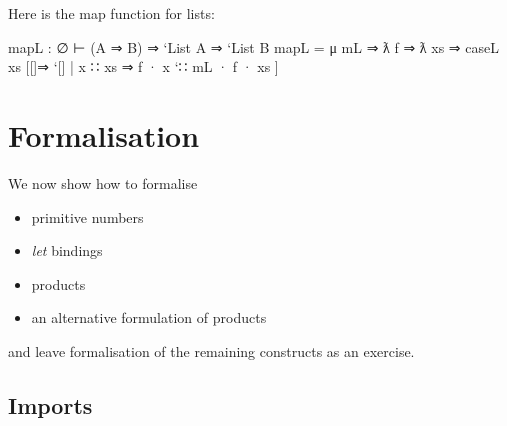 Here is the map function for lists:

\begin{myDisplay}
mapL : ∅ ⊢ (A ⇒ B) ⇒ `List A ⇒ `List B
mapL = μ mL ⇒ ƛ f ⇒ ƛ xs ⇒
         caseL xs
           [[]⇒ `[]
           | x ∷ xs ⇒ f · x `∷ mL · f · xs ]
\end{myDisplay}

\hypertarget{formalisation}{%
\section{Formalisation}\label{formalisation}}

We now show how to formalise

\begin{itemize}
\tightlist
\item
  primitive numbers
\item
  \emph{let} bindings
\item
  products
\item
  an alternative formulation of products
\end{itemize}

and leave formalisation of the remaining constructs as an exercise.

\hypertarget{imports}{%
\subsection{Imports}\label{imports}}

